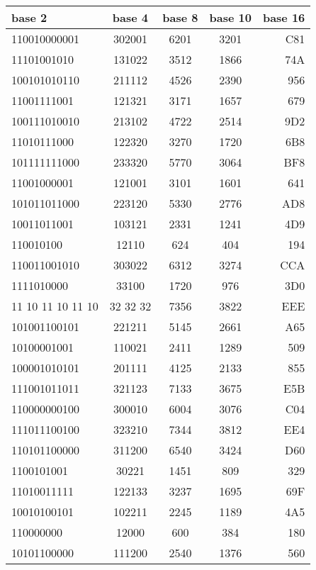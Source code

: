 \documentclass[12pt]{article}
\begin{document}
\begin{center}
\begin{tabular}{||l|c|c|c|r||}

\hline
base 2 & base 4 & base 8 & base 10 & base 16 \\ \hline
110010000001 & 302001 & 6201 & 3201 & C81 \\ \hline
11101001010 & 131022 & 3512 & 1866 & 74A \\ \hline
100101010110 & 211112 & 4526 & 2390 & 956 \\ \hline
11001111001 & 121321 & 3171 & 1657 & 679 \\ \hline
100111010010 & 213102 & 4722 & 2514 & 9D2 \\ \hline
11010111000 & 122320 & 3270 & 1720 & 6B8 \\ \hline
101111111000 & 233320 & 5770 & 3064 & BF8 \\ \hline
11001000001 & 121001 & 3101 & 1601 & 641 \\ \hline
101011011000 & 223120 & 5330 & 2776 & AD8 \\ \hline
10011011001 & 103121 & 2331 & 1241 & 4D9 \\ \hline
110010100 & 12110 & 624 & 404 & 194 \\ \hline
110011001010 & 303022 & 6312 & 3274 & CCA \\ \hline
1111010000 & 33100 & 1720 & 976 & 3D0 \\ \hline
11 10 11 10 11 10 & 32 32 32 & 7356 & 3822 & EEE \\ \hline
101001100101 & 221211 & 5145 & 2661 & A65 \\ \hline
10100001001 & 110021 & 2411 & 1289 & 509 \\ \hline
100001010101 & 201111 & 4125 & 2133 & 855 \\ \hline
111001011011 & 321123 & 7133 & 3675 & E5B \\ \hline
110000000100 & 300010 & 6004 & 3076 & C04 \\ \hline
111011100100 & 323210 & 7344 & 3812 & EE4 \\ \hline
110101100000 & 311200 & 6540 & 3424 & D60 \\ \hline
1100101001 & 30221 & 1451 & 809 & 329 \\ \hline
11010011111 & 122133 & 3237 & 1695 & 69F \\ \hline
10010100101 & 102211 & 2245 & 1189 & 4A5 \\ \hline
110000000 & 12000 & 600 & 384 & 180 \\ \hline
10101100000 & 111200 & 2540 & 1376 & 560 \\ \hline

\end{tabular}
\end{center}
\end{document}
